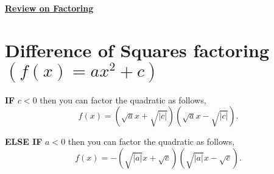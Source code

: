 \documentclass[12pt]{article} %
\begin{document}
	\renewcommand*{\coursecode}{MATH 235} %
	\renewcommand*{\assgnnumber}{Assignment 1} %
	\renewcommand*{\submdate}{September 14, 2021} %
	\renewcommand*{\studentfname}{Abdullah} %
	\renewcommand*{\studentlname}{Zubair} %
    \renewcommand*{\proofname}{Proof:}

	\renewcommand\qedsymbol{$\blacksquare$}
	\setfigpath
	\fancyhfoffset[L,O]{0pt} %




\begin{center}
		\Huge{\underline{\textbf{Review on Factoring}}}
\end{center}

\section{Difference of Squares factoring $(f(x) = ax^2 + c)$}
\textbf{IF} $c < 0$ then you can factor the quadratic as follows,
\[
    f(x) = \left(\sqrt{a} x + \sqrt{\left|c\right|} \right)\left(\sqrt{a} x - \sqrt{\left|c\right|} \right)
.\] 

\textbf{ELSE IF} $a < 0$ then you can factor the quadratic as follows,
\[
    f(x) = -\left(\sqrt{\left|a\right|} x + \sqrt{c} \right)\left(\sqrt{\left|a\right|} x - \sqrt{c} \right)
.\] 
\end{document}

